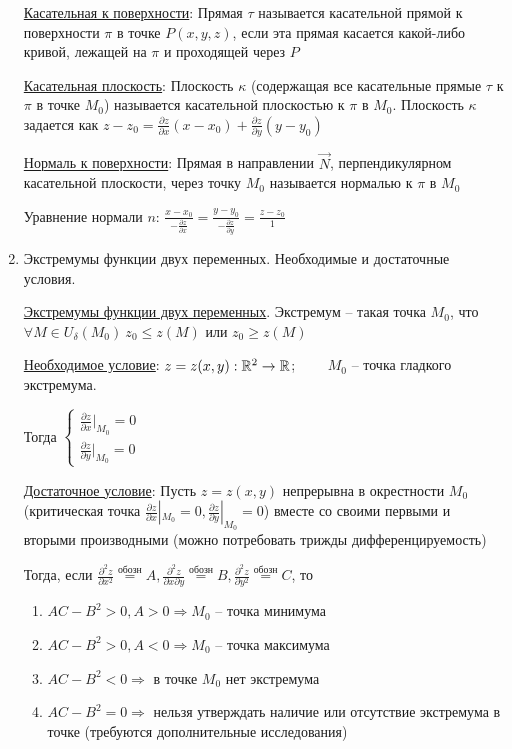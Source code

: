 \documentclass[12pt]{article}
\begin{document}
\begin{enumerate}
        \hyperlink{tangenttosurface}{Касательная к поверхности}: Прямая $\tau$ называется касательной прямой к поверхности $\pi$ в точке $P(x, y, z)$,
        если эта прямая касается какой-либо кривой, лежащей на $\pi$ и проходящей через $P$

        \hyperlink{tangentplanetosurface}{Касательная плоскость}: Плоскость $\kappa$ (содержащая все касательные прямые $\tau$ к $\pi$ в точке $M_0$) называется касательной плоскостью к $\pi$ в $M_0$. Плоскость $\kappa$ задается как $z - z_0 = \frac{\partial z}{\partial x}(x - x_0) + \frac{\partial z}{\partial y} (y - y_0)$

        \hyperlink{normaltosurface}{Нормаль к поверхности}: Прямая в направлении $\vec{N}$, перпендикулярном касательной плоскости, через точку $M_0$ называется нормалью к $\pi$ в $M_0$

        Уравнение нормали $n$: $\frac{x - x_0}{-\frac{\partial z}{\partial x}} = \frac{y - y_0}{-\frac{\partial z}{\partial y}} = \frac{z - z_0}{1}$


        \item Экстремумы функции двух переменных. Необходимые и достаточные условия.

        \hyperlink{extremumsoffunctions}{Экстремумы функции двух переменных}.
        Экстремум -- такая точка $M_0$, что $\forall M \in U_\delta(M_0) \ z_0 \leq z(M)$ или $z_0 \geq z(M)$

        \hyperlink{extremumnecessarycondition}{Необходимое условие}: $z = z(x, y) : \mathbb{R}^2 \rightarrow \mathbb{R}$; $\quad\quad M_0$ -- точка гладкого экстремума.

        Тогда $\begin{cases}\frac{\partial z}{\partial x} |_{M_0} = 0 \\ \frac{\partial z}{\partial y} |_{M_0} = 0\end{cases}$

        \hyperlink{extremumsufficientcondition}{Достаточное условие}: Пусть $z = z(x, y)$ непрерывна в окрестности $M_0$ (критическая точка $\frac{\partial z}{\partial x} |_{M_0} = 0, \frac{\partial z}{\partial y} |_{M_0} = 0$)
        вместе со своими первыми и вторыми производными (можно потребовать трижды дифференцируемость)

        Тогда, если $\frac{\partial^2 z}{\partial x^2} \stackrel{\text{обозн}}{=} A, \frac{\partial^2 z}{\partial x \partial y} \stackrel{\text{обозн}}{=} B, \frac{\partial^2 z}{\partial y^2} \stackrel{\text{обозн}}{=} C$, то

        \begin{enumerate}
            \item $AC - B^2 > 0, A > 0 \Longrightarrow M_0$ -- точка минимума
            \item $AC - B^2 > 0, A < 0 \Longrightarrow M_0$ -- точка максимума
            \item $AC - B^2 < 0 \Longrightarrow$ в точке $M_0$ нет экстремума
            \item $AC - B^2 = 0\Longrightarrow$ нельзя утверждать наличие или отсутствие экстремума в точке (требуются дополнительные исследования)
        \end{enumerate}


\end{enumerate}
\end{document}
